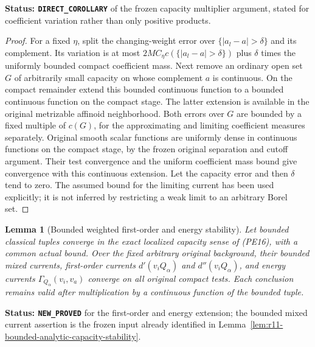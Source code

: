 \documentclass[11pt,a4paper]{article}
\numberwithin{equation}{section}
\newtheorem{lemma}[theorem]{Lemma}
\theoremstyle{definition}
\theoremstyle{remark}
\begin{document}
\noindent\textbf{Status: \texttt{DIRECT\_COROLLARY}} of
the frozen capacity multiplier argument, stated for
coefficient variation rather than only positive products.

\begin{proof}
For a fixed $\eta$, split the changing-weight error over
$\{|a_l-a|>\delta\}$ and its complement. Its variation
is at most
$2M C_\eta c(\{|a_l-a|>\delta\})$ plus $\delta$ times
the uniformly bounded compact coefficient mass.
Next remove an ordinary open set $G$ of arbitrarily small
capacity on whose complement $a$ is continuous.
On the compact remainder extend this bounded continuous
function to a bounded continuous function on the compact
stage. The latter extension is available in the original
metrizable affinoid neighborhood. Both errors over $G$
are bounded by a fixed multiple of $c(G)$, for the
approximating and limiting coefficient measures separately.
Original smooth scalar functions are uniformly dense in
continuous functions on the compact stage, by the frozen
original separation and cutoff argument. Their test
convergence and the uniform coefficient mass bound give
convergence with this continuous extension. Let the
capacity error and then $\delta$ tend to zero.
The assumed bound for the limiting current has been used
explicitly; it is not inferred by restricting a weak
limit to an arbitrary Borel set.
\end{proof}

\begin{lemma}[Bounded weighted first-order and energy stability]
\label{lem:r11-bounded-first-energy-capacity-stability}
Let bounded classical tuples converge in the exact
localized capacity sense of (PE16), with a common actual
bound. Over the fixed arbitrary original background,
their bounded mixed currents, first-order currents
$d'(v_iQ_\alpha)$ and $d''(v_iQ_\alpha)$, and energy
currents $\Gamma_{Q_\alpha}(v_i,v_a)$ converge on all
original compact tests. Each conclusion remains valid
after multiplication by a continuous function of the
bounded tuple.
\end{lemma}

\noindent\textbf{Status: \texttt{NEW\_PROVED}} for the
first-order and energy extension; the bounded mixed
current assertion is the frozen input already identified
in Lemma~\ref{lem:r11-bounded-analytic-capacity-stability}.
\end{document}
